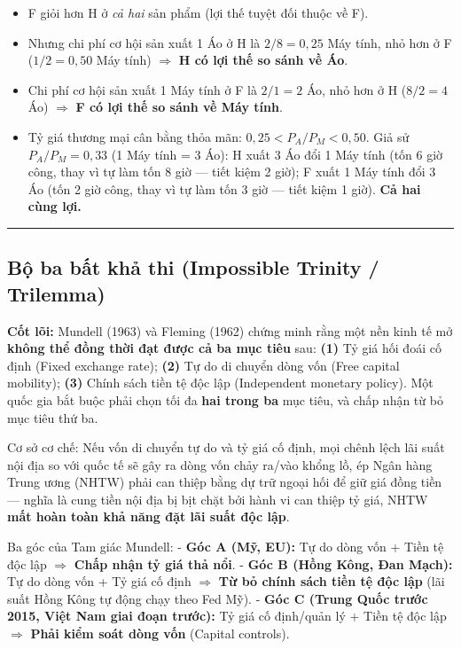 \documentclass[
]{article}
\providecommand{\tightlist}{%
  \setlength{\itemsep}{0pt}\setlength{\parskip}{0pt}}
\begin{document}
\begin{itemize}
\tightlist
\item
  F giỏi hơn H ở \emph{cả hai} sản phẩm (lợi thế tuyệt đối thuộc về F).
\item
  Nhưng chi phí cơ hội sản xuất 1 Áo ở H là \(2/8 = 0{,}25\) Máy tính,
  nhỏ hơn ở F (\(1/2 = 0{,}50\) Máy tính) \(\Rightarrow\) \textbf{H có
  lợi thế so sánh về Áo}.
\item
  Chi phí cơ hội sản xuất 1 Máy tính ở F là \(2/1 = 2\) Áo, nhỏ hơn ở H
  (\(8/2 = 4\) Áo) \(\Rightarrow\) \textbf{F có lợi thế so sánh về Máy
  tính}.
\item
  Tỷ giá thương mại cân bằng thỏa mãn: \(0{,}25 < P_A/P_M < 0{,}50\).
  Giả sử \(P_A/P_M = 0{,}33\) (1 Máy tính = 3 Áo): H xuất 3 Áo đổi 1 Máy
  tính (tốn 6 giờ công, thay vì tự làm tốn 8 giờ --- tiết kiệm 2 giờ); F
  xuất 1 Máy tính đổi 3 Áo (tốn 2 giờ công, thay vì tự làm tốn 3 giờ ---
  tiết kiệm 1 giờ). \textbf{Cả hai cùng lợi.}
\end{itemize}

\begin{center}\rule{0.5\linewidth}{0.5pt}\end{center}

\subsection{Bộ ba bất khả thi (Impossible Trinity /
Trilemma)}\label{bux1ed9-ba-bux1ea5t-khux1ea3-thi-impossible-trinity-trilemma}

\textbf{Cốt lõi:} Mundell (1963) và Fleming (1962) chứng minh rằng một
nền kinh tế mở \textbf{không thể đồng thời đạt được cả ba mục tiêu} sau:
\textbf{(1)} Tỷ giá hối đoái cố định (Fixed exchange rate); \textbf{(2)}
Tự do di chuyển dòng vốn (Free capital mobility); \textbf{(3)} Chính
sách tiền tệ độc lập (Independent monetary policy). Một quốc gia bắt
buộc phải chọn tối đa \textbf{hai trong ba} mục tiêu, và chấp nhận từ bỏ
mục tiêu thứ ba.

Cơ sở cơ chế: Nếu vốn di chuyển tự do và tỷ giá cố định, mọi chênh lệch
lãi suất nội địa so với quốc tế sẽ gây ra dòng vốn chảy ra/vào khổng lồ,
ép Ngân hàng Trung ương (NHTW) phải can thiệp bằng dự trữ ngoại hối để
giữ giá đồng tiền --- nghĩa là cung tiền nội địa bị bịt chặt bởi hành vi
can thiệp tỷ giá, NHTW \textbf{mất hoàn toàn khả năng đặt lãi suất độc
lập}.

Ba góc của Tam giác Mundell: - \textbf{Góc A (Mỹ, EU):} Tự do dòng vốn +
Tiền tệ độc lập \(\Rightarrow\) \textbf{Chấp nhận tỷ giá thả nổi}. -
\textbf{Góc B (Hồng Kông, Đan Mạch):} Tự do dòng vốn + Tỷ giá cố định
\(\Rightarrow\) \textbf{Từ bỏ chính sách tiền tệ độc lập} (lãi suất Hồng
Kông tự động chạy theo Fed Mỹ). - \textbf{Góc C (Trung Quốc trước 2015,
Việt Nam giai đoạn trước):} Tỷ giá cố định/quản lý + Tiền tệ độc lập
\(\Rightarrow\) \textbf{Phải kiểm soát dòng vốn} (Capital controls).
\end{document}
